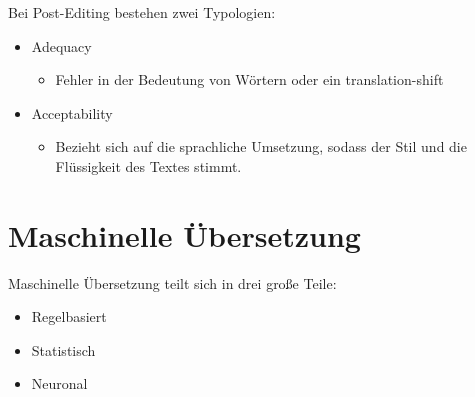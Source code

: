 \documentclass{article}
\begin{document}
	Bei Post-Editing bestehen zwei Typologien: \\
	\begin{itemize}
		\item{Adequacy}
		\begin{itemize}
			\item{Fehler in der Bedeutung von Wörtern oder ein translation-shift}
		\end{itemize}
		\item{Acceptability}
		\begin{itemize}
			\item{Bezieht sich auf die sprachliche Umsetzung, sodass der Stil und die Flüssigkeit des Textes stimmt.}
		\end{itemize}
	\end{itemize}

	\section{Maschinelle Übersetzung}
	Maschinelle Übersetzung teilt sich in drei große Teile: \\
	\begin{itemize}
		\item{Regelbasiert}
		\item{Statistisch}
		\item{Neuronal}
	\end{itemize}
\end{document}
